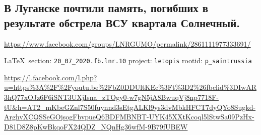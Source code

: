  
 

\subsection{В Луганске почтили память, погибших в результате обстрела ВСУ квартала Солнечный.}
\url{https://www.facebook.com/groups/LNRGUMO/permalink/2861111977333691/}
  
\vspace{0.5cm}
{\small\LaTeX~section: \verb|20_07_2020.fb.lnr.10| project: \verb|letopis| rootid: \verb|p_saintrussia|}
\vspace{0.5cm}

\url{https://l.facebook.com/l.php?u=https%3A%2F%2Fyoutu.be%2FbZ0DDUltKEc%3Ft%3D2%26fbclid%3DIwAR3hQ77xOJz6F6iSNT3UXjIsna_zTOgy0-w7gN5jA8BwuqVj8np7718F-tU&h=AT2_mKbeGZnl7S50fuynnd3sEtgALKl9ys3dvMbkHFCT7dyQYo8Sugkd-ArghvXCQSSeGOjsogFbvpueQ6BDFMBNBT-UYK45XXtKcoql5lStwSa09PzHx-D81D8Z8pKwBkqoFX24QDZ_NQnHg36wfM-9B79fUBEW}
  
